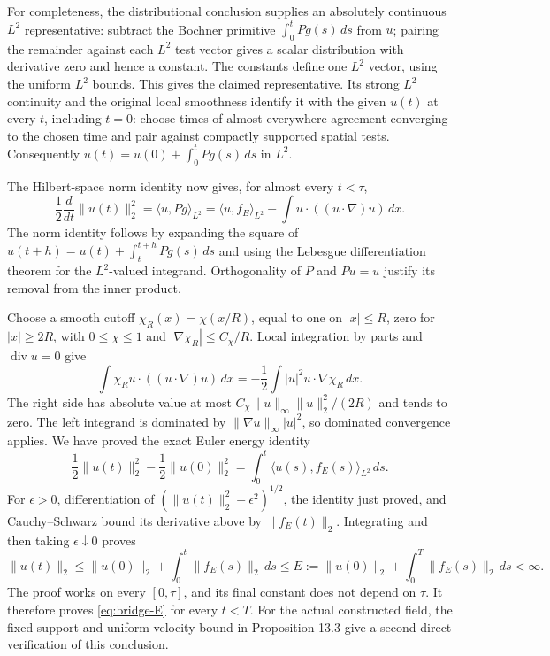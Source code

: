 For completeness, the distributional conclusion supplies an absolutely
continuous $L^2$ representative: subtract the Bochner primitive
$\int_0^t Pg(s)\,ds$ from $u$; pairing the remainder against each
$L^2$ test vector gives a scalar distribution with derivative zero and
hence a constant.  The constants define one $L^2$ vector, using the
uniform $L^2$ bounds.  This gives the claimed representative.  Its
strong $L^2$ continuity and the original local smoothness identify it
with the given $u(t)$ at every $t$, including $t=0$: choose times of
almost-everywhere agreement converging to the chosen time and pair
against compactly supported spatial tests.  Consequently
$u(t)=u(0)+\int_0^t Pg(s)\,ds$ in $L^2$.

The Hilbert-space norm identity now gives, for almost every $t<\tau$,
\[
 \frac12\frac{d}{dt}\|u(t)\|_2^2
    =\langle u,Pg\rangle_{L^2}
    =\langle u,f_E\rangle_{L^2}
      -\int u\cdot((u\cdot\nabla)u)\,dx.
\]
The norm identity follows by expanding the square of
$u(t+h)=u(t)+\int_t^{t+h}Pg(s)\,ds$ and using the Lebesgue
differentiation theorem for the $L^2$-valued integrand.  Orthogonality
of $P$ and $Pu=u$ justify its removal from the inner product.

Choose a smooth cutoff $\chi_R(x)=\chi(x/R)$, equal to one on
$|x|\le R$, zero for $|x|\ge2R$, with $0\le\chi\le1$ and
$|\nabla\chi_R|\le C_\chi/R$.  Local integration by parts and
$\operatorname{div}u=0$ give
\[
 \int\chi_R u\cdot((u\cdot\nabla)u)\,dx
       =-\frac12\int|u|^2u\cdot\nabla\chi_R\,dx.
\]
The right side has absolute value at most
$C_\chi\|u\|_\infty\|u\|_2^2/(2R)$ and tends to zero.
The left integrand is dominated by
$\|\nabla u\|_\infty|u|^2$, so dominated convergence applies.
We have proved the exact Euler energy identity
\begin{equation}\label{eq:bridge-energy-identity}
 \frac12\|u(t)\|_2^2-\frac12\|u(0)\|_2^2
          =\int_0^t\langle u(s),f_E(s)\rangle_{L^2}\,ds.
\end{equation}
For $\epsilon>0$, differentiation of
$(\|u(t)\|_2^2+\epsilon^2)^{1/2}$, the identity just proved, and
Cauchy--Schwarz bound its derivative above by $\|f_E(t)\|_2$.
Integrating and then taking $\epsilon\downarrow0$ proves
\begin{equation}\label{eq:bridge-E}
 \|u(t)\|_2\le\|u(0)\|_2+\int_0^t\|f_E(s)\|_2\,ds
 \le E:=\|u(0)\|_2+\int_0^T\|f_E(s)\|_2\,ds<\infty.
\end{equation}
The proof works on every $[0,\tau]$, and its final constant does not
depend on $\tau$.  It therefore proves \eqref{eq:bridge-E} for every
$t<T$.  For the actual constructed field, the fixed support and
uniform velocity bound in Proposition 13.3 give a second direct
verification of this conclusion.

